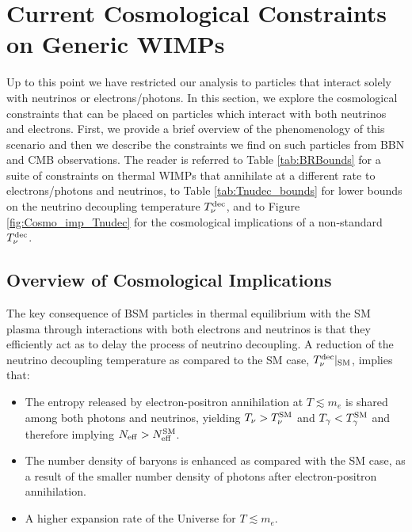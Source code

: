 \documentclass[notitlepage,letterpaper,natbib,aps,prd,onecolumn,amsmath,amsfonts,nofootinbib,preprintnumbers,superscriptaddress,secnumarabic,groupedaddress]{revtex4-1}
\begin{document}
\section{Current Cosmological Constraints on Generic WIMPs}\label{sec:results_mixed}

Up to this point we have restricted our analysis to particles that interact solely with neutrinos or electrons/photons. In this section, we explore the cosmological constraints that can be placed on particles which interact with both neutrinos and electrons. First, we provide a brief overview of the phenomenology of this scenario and then we describe the constraints we find on such particles from BBN and CMB observations. The reader is referred to Table \ref{tab:BRBounds} for a suite of constraints on thermal WIMPs that annihilate at a different rate to electrons/photons and neutrinos, to Table \ref{tab:Tnudec_bounds} for lower bounds on the neutrino decoupling temperature $T_{\nu}^{\rm dec}$, and to Figure \ref{fig:Cosmo_imp_Tnudec} for the cosmological implications of a non-standard $T_{\nu}^{\rm dec}$.

\subsection{Overview of Cosmological Implications}

The key consequence of BSM particles in thermal equilibrium with the SM plasma through interactions with both electrons and neutrinos is that they efficiently act as to delay the process of neutrino decoupling. A reduction of the neutrino decoupling temperature as compared to the SM case, $T_{\nu} ^{\rm dec}|_{\rm SM}$, implies that:\vspace{-0.1cm}
\begin{itemize}[leftmargin=0.7cm,itemsep=-1pt]
    \item The entropy released by electron-positron annihilation at $T\lesssim m_e$ is shared among both photons and neutrinos, yielding $T_\nu > T_\nu^{\rm SM}$ and $T_\gamma < T_\gamma ^{\rm SM}$ and therefore implying $N_{\rm eff} > N_{\rm eff}^{\rm SM}$.
    \item The number density of baryons is enhanced as compared with the SM case, as a result of the smaller number density of photons after electron-positron annihilation. \item A higher expansion rate of the Universe for $T \lesssim m_e$. 
\end{itemize}
\end{document}
